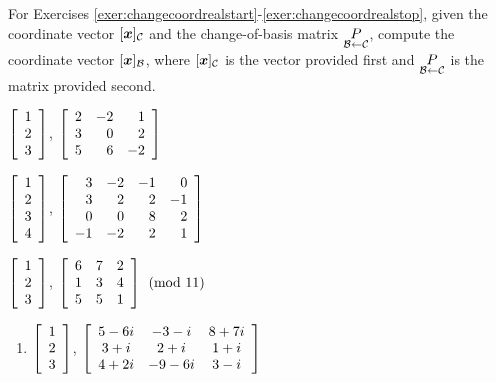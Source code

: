 \noindent For Exercises \ref{exer:changecoordrealstart}-\ref{exer:changecoordrealstop}, given the coordinate vector $[\bb x]_{\mathcal{C}}$ and the change-of-basis matrix $\underset{\B\leftarrow \c}{P}$, compute the coordinate vector $[\bb x]_{\mathcal{B}}$, where $[\bb x]_\mathcal{C}$ is the vector provided first and $\underset{\B\leftarrow \c}{P}$ is the matrix provided second.  
\begin{enumerate}[!HW!, label=$\spadesuit$ \arabic*., ref=\arabic*]
\begin{multicols}{3}
\item\label{exer:changecoordrealstart} $\vr{1\\2\\3}$, $\mtx{rrr}{2&-2&1\\3&0&2\\5&6&-2}$
\item $\vr{1\\2\\3\\4}$, $\mtx{rrrr}{3&-2&-1&0\\3&2&2&-1\\0&0&8&2\\-1&-2&2&1}$
\item
$\vr{1\\2\\3}$, \mbox{$\mtx{rrr}{6 & 7 & 2 \\ 1 & 3 & 4 \\ 5 & 5 & 1} \pmod{11}$}
\end{multicols}
\end{enumerate}
\begin{enumerate}[!HW!]
\item \label{exer:changecoordrealstop} $\vr{1\\2\\3}$, $\mtx{ccc}{5-6i&-3-i&8+7i\\3+i&2+i&1+i\\4+2i&-9-6i&3-i}$ %
\end{enumerate}


